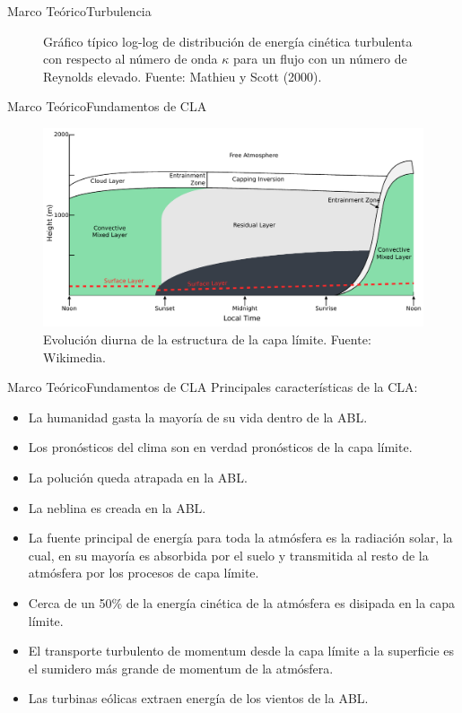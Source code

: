 \documentclass[mathserif,10pt]{beamer}
\begin{document}
\begin{frame}{Marco Teórico}{Turbulencia}
\begin{figure}[h!]
		\caption{Gráfico típico log-log de distribución de energía cinética turbulenta con respecto al número de onda $\kappa$ para un flujo con un número de Reynolds elevado. Fuente: Mathieu y Scott (2000).}
		\label{fig:03_spectra}
	\end{figure}
\end{frame}

\begin{frame}{Marco Teórico}{Fundamentos de CLA}
	\begin{figure}[h!]
		\centering
		\includegraphics[width=0.98\linewidth,trim={0cm 0cm 0cm 0cm},clip]{fig/03/abl}
		\caption{Evolución diurna de la estructura de la capa límite. Fuente: Wikimedia.}
		\label{fig:03_abl}
	\end{figure}
\end{frame}

\begin{frame}{Marco Teórico}{Fundamentos de CLA}
	Principales características de la CLA:
	\begin{itemize}
		\item La humanidad gasta la mayoría de su vida dentro de la ABL.
		\item Los pronósticos del clima son en verdad pronósticos de la capa límite.
		\item La polución queda atrapada en la ABL.
		\item La neblina es creada en la ABL.
		\item La fuente principal de energía para toda la atmósfera es la radiación solar, la cual, en su mayoría es absorbida por el suelo y transmitida al resto de la atmósfera por los procesos de capa límite.
		\item Cerca de un 50\% de la energía cinética de la atmósfera es disipada en la capa límite.
		\item El transporte turbulento de momentum desde la capa límite a la superficie es el sumidero más grande de momentum de la atmósfera.
		\item Las turbinas eólicas extraen energía de los vientos de la ABL.
	\end{itemize}
\end{frame}
\end{document}
